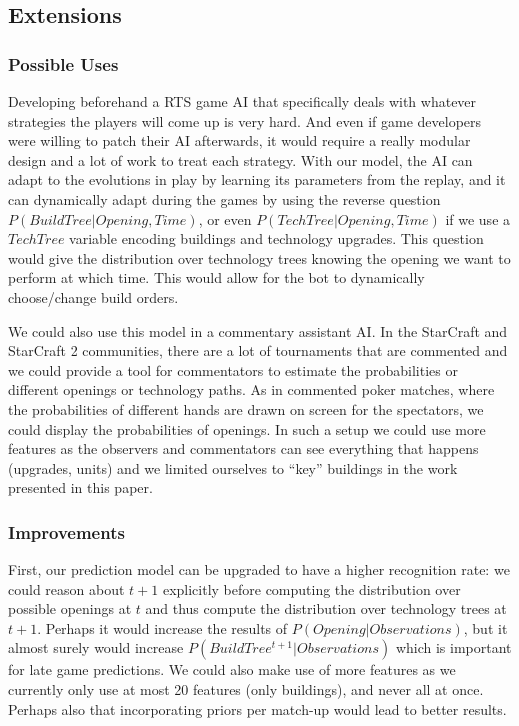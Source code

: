 \subsection{Extensions}

\subsubsection{Possible Uses}
Developing beforehand a RTS game AI that specifically deals with whatever strategies the players will come up is very hard. And even if game developers were willing to patch their AI afterwards, it would require a really modular design and a lot of work to treat each strategy. With our model, the AI can adapt to the evolutions in play by learning its parameters from the replay, and it can dynamically adapt during the games by using the reverse question $P(BuildTree | Opening,Time)$, or even $P(TechTree | Opening, Time)$ if we use a $TechTree$ variable encoding buildings and technology upgrades. This question would give the distribution over technology trees knowing the opening we want to perform at which time. This would allow for the bot to dynamically choose/change build orders.

We could also use this model in a commentary assistant AI. In the StarCraft and StarCraft 2 communities, there are a lot of  tournaments that are commented and we could provide a tool for commentators to estimate the probabilities or different openings or technology paths. As in commented poker matches, where the probabilities of different hands are drawn on screen for the spectators, we could display the probabilities of openings. In such a setup we could use more features as the observers and commentators can see everything that happens (upgrades, units) and we limited ourselves to ``key'' buildings in the work presented in this paper.

\subsubsection{Improvements}

First, our prediction model can be upgraded to have a higher recognition rate: we could reason about $t+1$ explicitly before computing the distribution over possible openings at $t$ and thus compute the distribution over technology trees at $t+1$. Perhaps it would increase the results of $P(Opening|Observations)$, but it almost surely would increase $P(BuildTree^{t+1}|Observations)$ which is important for late game predictions. We could also make use of more features as we currently only use at most 20 features (only buildings), and never all at once. Perhaps also that incorporating priors per match-up would lead to better results.

